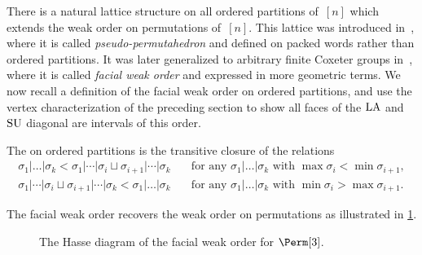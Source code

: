 There is a natural lattice structure on all ordered partitions of~$[n]$ which extends the weak order on permutations of~$[n]$.
This lattice was introduced in~\cite{KrobLatapyNovelliPhanSchwer}, where it is called \emph{pseudo-permutahedron} and defined on packed words rather than ordered partitions.
It was later generalized to arbitrary finite Coxeter groups in~\cite{PalaciosRonco, DermenjianHohlwegPilaud}, where it is called \emph{facial weak order} and expressed in more geometric terms.
We now recall a definition of the facial weak order on ordered partitions, and use the vertex characterization of the preceding section to show all faces of the  $\mathrm{LA}$ and $\mathrm{SU}$ diagonal are intervals of this order.

\begin{definition}
The  on ordered partitions is the transitive closure of the relations
\begin{align}
    \sigma_1|\dots|\sigma_k < \sigma_1|\cdots|\sigma_i \sqcup \sigma_{i+1}|\cdots|\sigma_k \quad & \text{for any } \sigma_1|\dots|\sigma_k \text{ with } \max \sigma_i < \min \sigma_{i+1},  \label{eq:facial weak 1}\\
    \sigma_1|\cdots|\sigma_i \sqcup \sigma_{i+1}|\cdots|\sigma_k < \sigma_1|\dots|\sigma_k \quad & \text{for any } \sigma_1|\dots|\sigma_k \text{ with } \min \sigma_i > \max \sigma_{i+1}. \label{eq:facial weak 2}
\end{align}
\end{definition}

The facial weak order recovers the weak order on permutations as illustrated in \cref{fig:Hasse diagram Perm3}.
\begin{figure}
\caption{The Hasse diagram of the facial weak order for $\Perm[3]$.}
\label{fig:Hasse diagram Perm3}
\end{figure}

